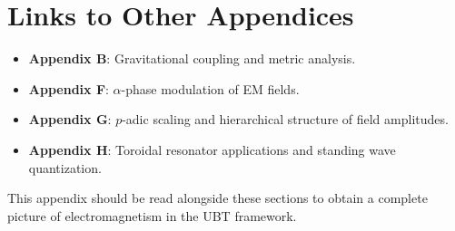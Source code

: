 \section{Links to Other Appendices}
\begin{itemize}
    \item \textbf{Appendix B}: Gravitational coupling and metric analysis.
    \item \textbf{Appendix F}: $\alpha$-phase modulation of EM fields.
    \item \textbf{Appendix G}: $p$-adic scaling and hierarchical structure of field amplitudes.
    \item \textbf{Appendix H}: Toroidal resonator applications and standing wave quantization.
\end{itemize}

This appendix should be read alongside these sections to obtain a complete picture of electromagnetism in the UBT framework.
